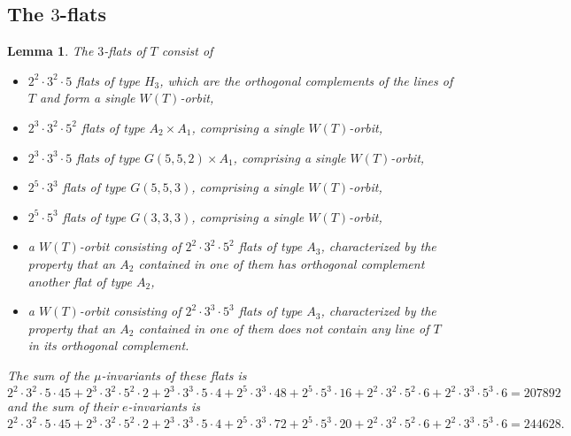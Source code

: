 \documentclass[11pt, reqno]{amsart}
\numberwithin{equation}{section}
\theoremstyle{definition}
\theoremstyle{plain}
\newtheorem{lemma}[theorem]{Lemma}
\begin{document}
\subsection{The $3$-flats}

\begin{lemma}
The $3$-flats of $T$ consist of
\begin{itemize}
\item[(a)] $2^2 \cdot 3^2 \cdot 5$ flats of type $H_3$, which are the orthogonal complements of the lines of $T$ and form a single $W(T)$-orbit,
\item[(b)] $2^3 \cdot 3^2 \cdot 5^2$ flats of type $A_2 \times A_1$, comprising a single $W(T)$-orbit,
\item[(c)] $2^3 \cdot 3^3 \cdot 5$ flats of type $G(5,5,2) \times A_1$, comprising a single $W(T)$-orbit,
\item[(d)] $2^5 \cdot 3^3$ flats of type $G(5,5,3)$, comprising a single $W(T)$-orbit,
\item[(e)] $2^5 \cdot 5^3$ flats of type $G(3,3,3)$, comprising a single $W(T)$-orbit,
\item[(f)] a $W(T)$-orbit consisting of $2^2 \cdot 3^2 \cdot 5^2$ flats of type $A_3$, characterized by the property that an $A_2$ contained in one of them has orthogonal complement another flat of type $A_2$,
\item[(g)] a $W(T)$-orbit consisting of $2^2 \cdot 3^3 \cdot 5^3$ flats of type $A_3$, characterized by the property that an $A_2$ contained in one of them does not contain any line of $T$ in its orthogonal complement.
\end{itemize} The sum of the $\mu$-invariants of these flats is
$$2^2 \cdot 3^2 \cdot 5 \cdot 45+2^3 \cdot 3^2 \cdot 5^2 \cdot 2+2^3 \cdot 3^3 \cdot 5 \cdot 4+2^5 \cdot 3^3 \cdot 48 +2^5 \cdot 5^3 \cdot 16 + 2^2 \cdot 3^2 \cdot 5^2 \cdot 6+2^2 \cdot 3^3 \cdot 5^3 \cdot 6=207892$$ and the sum of their $e$-invariants is
$$2^2 \cdot 3^2 \cdot 5 \cdot 45+2^3 \cdot 3^2 \cdot 5^2 \cdot 2+2^3 \cdot 3^3 \cdot 5 \cdot 4+2^5 \cdot 3^3 \cdot 72+2^5 \cdot 5^3 \cdot 20+2^2 \cdot 3^2 \cdot 5^2 \cdot 6+2^2 \cdot 3^3 \cdot 5^3 \cdot 6=244628.$$
\end{lemma}
\end{document}

